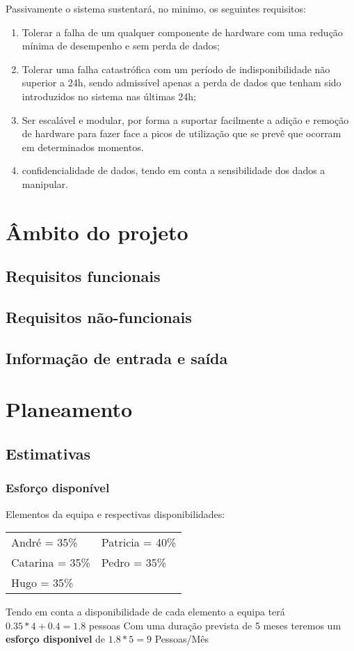 \documentclass[a4paper]{report}
\begin{document}
Passivamente o sistema sustentará, no minimo, os seguintes requisitos:
\begin{enumerate}
\item Tolerar a falha de um qualquer componente de hardware com uma redução mínima de desempenho e sem perda de dados;
\item Tolerar uma falha catastrófica com um período de indisponibilidade não superior a 24h, sendo admissível apenas a perda de dados que tenham sido introduzidos no sistema nas últimas 24h;
\item Ser escalável e modular, por forma a suportar facilmente a adição e remoção de hardware para fazer face a picos de utilização que se prevê que ocorram em determinados momentos.
\item confidencialidade de dados, tendo em conta a sensibilidade dos dados a manipular.
\end{enumerate}
\chapter{Âmbito do projeto}
\section{Requisitos funcionais}
\section{Requisitos não-funcionais}
\section{Informação de entrada e saída}
\chapter{Planeamento}
\section{Estimativas}
\subsection{Esforço disponível}
Elementos da equipa e respectivas disponibilidades:\\

\begin{tabularx}{\textwidth}{XX}
	André = 35\%    & Patricia = 40\% \\
	Catarina = 35\% & Pedro = 35\%    \\
	Hugo = 35\%     &
\end{tabularx}
\linebreak\linebreak
Tendo em conta a disponibilidade de cada elemento a equipa terá $0.35*4 + 0.4 =1.8$ pessoas\linebreak
Com uma duração prevista de 5 meses teremos um \textbf{esforço disponivel} de $1.8*5=9$ Pessoas/Mês
\end{document}
